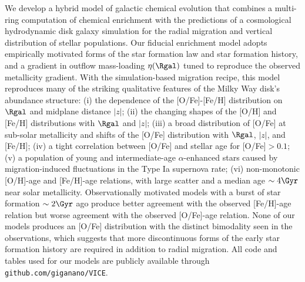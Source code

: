 We develop a hybrid model of galactic chemical evolution that combines a
multi-ring computation of chemical enrichment with the predictions of a 
cosmological hydrodynamic disk galaxy simulation for the radial migration and
vertical distribution of stellar populations.  Our fiducial enrichment model 
adopts empirically motivated forms of the star formation law and star formation 
history, and a gradient in outflow mass-loading $\eta(\Rgal)$ tuned to 
reproduce the observed metallicity gradient.  With the simulation-based
migration recipe, this model reproduces many of the striking qualitative 
features of the Milky Way disk's abundance structure: (i) the dependence
of the [O/Fe]-[Fe/H] distribution on $\Rgal$ and midplane distance $|z|$;
(ii) the changing shapes of the [O/H] and [Fe/H] distributions with $\Rgal$
and $|z|$; (iii) a broad distribution of [O/Fe] at sub-solar metallicity and
shifts of the [O/Fe] distribution with $\Rgal$, $|z|$, and [Fe/H]; (iv) a
tight correlation between [O/Fe] and stellar age for [O/Fe]$>0.1$; (v) a
population of young and intermediate-age $\alpha$-enhanced stars caused by
migration-induced fluctuations in the Type Ia supernova rate; 
(vi) non-monotonic [O/H]-age and [Fe/H]-age relations, with large scatter
and a median age $\sim 4\Gyr$ near solar metallicity.  Observationally 
motivated models with a burst of star formation $\sim 2\Gyr$ ago produce
better agreement with the observed [Fe/H]-age relation but worse agreement 
with the observed [O/Fe]-age relation.  None of our models produces an [O/Fe] 
distribution with the distinct bimodality seen in the observations, which 
suggests that more discontinuous forms of the early star formation history 
are required in addition to radial migration.  All code and tables used for 
our models are publicly available through {\tt github.com/giganano/VICE}.
